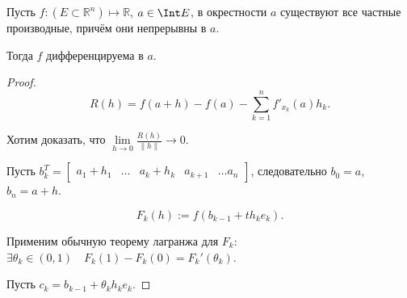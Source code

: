 \begin{theorem} \thmslashn

    Пусть $f : (E \subset \mathbb{R}^{n}) \mapsto \mathbb{R}$, $a\in \Int E$, в окрестности $a$ существуют все частные производные, причём они непрерывны в $a$.

    Тогда $f$ дифференцируема в $a$.
    \begin{proof} \thmslashn
    
        \[ R(h) = f(a+h) - f(a) - \sum\limits_{k=1}^{n} f'_{x_{k}}(a)h_{k} .\]

        Хотим доказать, что $\lim\limits_{h \to 0} \frac{R(h)}{\|h\|} \to 0$.

        Пусть $b_{k}^{T} = \begin{bmatrix} a_1+h_1 & \ldots & a_{k}+h_{k} & a_{k+1} & \ldots a_{n}\end{bmatrix}$, следовательно $b_0 = a$, $b_{n} = a+h$.


        \[ F_{k}(h) := f(b_{k-1} + th_{k}e_{k}) .\] 

        Применим обычную теорему лагранжа для $F_{k}$: $\exists{\theta_{k}\in (0, 1)}\quad F_{k}(1) - F_{k}(0) = F_{k}'(\theta_{k})$.

        Пусть $c_{k} = b_{k-1} + \theta_{k}h_{k}e_{k}$.


\end{proof}
\end{theorem}
